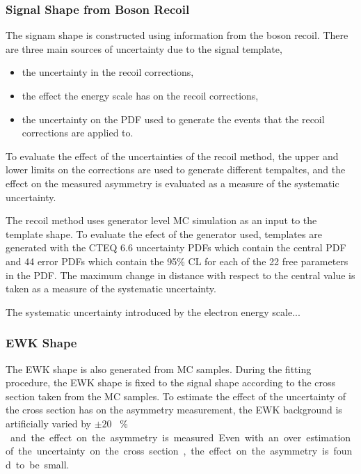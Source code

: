 \subsubsection{Signal \ETm Shape from Boson Recoil}

The signam \ETm shape is constructed using information from the boson recoil.
There are three main sources of uncertainty due to the signal template,

\begin{itemize}
    \item the uncertainty in the recoil corrections,
    \item the effect the energy scale has on the recoil corrections,
    \item the uncertainty on the \ac{PDF} used to generate the events that the
recoil corrections are applied to.
\end{itemize}

To evaluate the effect of the uncertainties of the recoil method, the upper and
lower limits on the corrections are used to generate different tempaltes, and
the effect on the measured asymmetry is evaluated as a measure of the
systematic uncertainty.

The recoil method uses generator level \ac{MC} simulation as an input to the
template shape. To evaluate the efect of the generator used, templates are
generated with the CTEQ 6.6 %
uncertainty \acp{PDF} which contain the central \ac{PDF} and 44 error \acp{PDF}
which contain the \unit{95}{\%} \ac{CL} for each of the 22 free parameters in
the \ac{PDF}. The maximum change in distance with respect to the central value
is taken as a measure of the systematic uncertainty.

The systematic uncertainty introduced by the electron energy scale...

\subsubsection{\ac{EWK} \ETm Shape}

The \ac{EWK} shape is also generated from \ac{MC} samples. During the fitting
procedure, the \ac{EWK} shape is fixed to the \Wenu signal shape according to
the cross section taken from the \ac{MC} samples. To estimate the effect of the
uncertainty of the cross section has on the asymmetry measurement, the \ac{EWK}
background is artificially varied by \unit{$\pm20$}{ \% } and the effect on the
asymmetry is measured. Even with an over estimation of the uncertainty on the
cross section, the effect on the asymmetry is found to be small.

